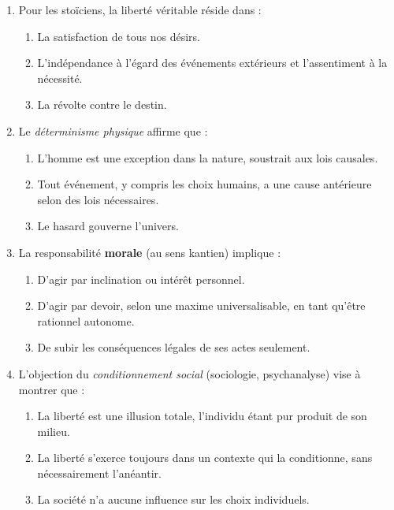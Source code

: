 \documentclass[11pt]{article}
\begin{document}
\begin{exercice}
\begin{enumerate}
    \item Pour les stoïciens, la liberté véritable réside dans :
    \begin{enumerate}
        \item La satisfaction de tous nos désirs.
        \item L'indépendance à l'égard des événements extérieurs et l'assentiment à la nécessité.
        \item La révolte contre le destin.
    \end{enumerate}
    \item Le \textit{déterminisme physique} affirme que :
    \begin{enumerate}
        \item L'homme est une exception dans la nature, soustrait aux lois causales.
        \item Tout événement, y compris les choix humains, a une cause antérieure selon des lois nécessaires.
        \item Le hasard gouverne l'univers.
    \end{enumerate}
    \item La responsabilité \textbf{morale} (au sens kantien) implique :
    \begin{enumerate}
        \item D'agir par inclination ou intérêt personnel.
        \item D'agir par devoir, selon une maxime universalisable, en tant qu'être rationnel autonome.
        \item De subir les conséquences légales de ses actes seulement.
    \end{enumerate}
    \item L'objection du \textit{conditionnement social} (sociologie, psychanalyse) vise à montrer que :
    \begin{enumerate}
        \item La liberté est une illusion totale, l'individu étant pur produit de son milieu.
        \item La liberté s'exerce toujours dans un contexte qui la conditionne, sans nécessairement l'anéantir.
        \item La société n'a aucune influence sur les choix individuels.
    \end{enumerate}
\end{enumerate}
\end{exercice}
\end{document}

